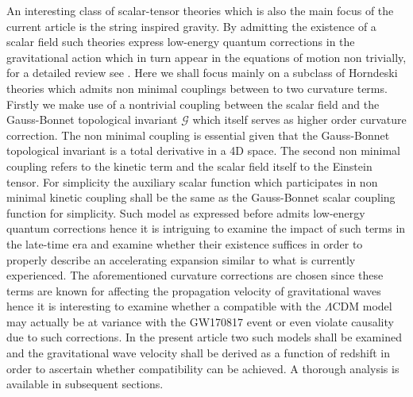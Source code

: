 \documentclass[aps,prd,twocolumn,groupedaddress,showpacs,nofootinbib,amssymb]{revtex4-2}
\begin{document}
An interesting class of scalar-tensor theories which is also the main focus of the current article is the string inspired gravity. By admitting the existence of a scalar field such theories express low-energy quantum corrections in the gravitational action which in turn appear in the equations of motion non trivially, for a detailed review see \cite{Odintsov:2020sqy,Oikonomou:2020sij,Oikonomou:2020tct,Oikonomou:2020tct,Odintsov:2020ilr,Venikoudis:2021oee,Venikoudis:2021irr}. Here we shall focus mainly on a subclass of Horndeski theories which admits non minimal couplings between to two curvature terms. Firstly we make use of a nontrivial coupling between the scalar field and the Gauss-Bonnet topological invariant $\mathcal{G}$ which itself serves as higher order curvature correction. The non minimal coupling is essential given that the Gauss-Bonnet topological invariant is a total derivative in a 4D space. The second non minimal coupling refers to the kinetic term and the scalar field itself to the Einstein tensor. For simplicity the auxiliary scalar function which participates in non minimal kinetic coupling shall be the same as the Gauss-Bonnet scalar coupling function for simplicity. Such model as expressed before admits low-energy quantum corrections hence it is intriguing to examine the impact of such terms in the late-time era and examine whether their existence suffices in order to properly describe an accelerating expansion similar to what is currently experienced. The aforementioned curvature corrections are chosen since these terms are known for affecting the propagation velocity of gravitational waves hence it is interesting to examine whether a compatible with the $\Lambda$CDM model may actually be at variance with the GW170817 event or even violate causality due to such corrections. In the present article two such models shall be examined and the gravitational wave velocity shall be derived as a function of redshift in order to ascertain whether compatibility can be achieved. A thorough analysis is available in subsequent sections.
\end{document}
